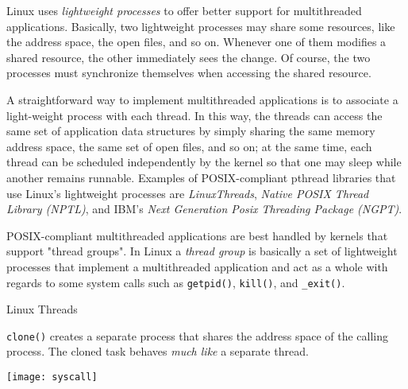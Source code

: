 Linux uses \emph{lightweight processes} to offer better support for multithreaded
applications. Basically, two lightweight processes may share some resources, like the
address space, the open files, and so on. Whenever one of them modifies a shared resource,
the other immediately sees the change. Of course, the two processes must synchronize
themselves when accessing the shared resource.

A straightforward way to implement multithreaded applications is to associate a
light-weight process with each thread. In this way, the threads can access the same set of
application data structures by simply sharing the same memory address space, the same set
of open files, and so on; at the same time, each thread can be scheduled independently by
the kernel so that one may sleep while another remains runnable. Examples of
POSIX-compliant pthread libraries that use Linux's lightweight processes are
\emph{LinuxThreads}, \emph{Native POSIX Thread Library (NPTL)}, and IBM's \emph{Next
  Generation Posix Threading Package (NGPT)}.

POSIX-compliant multithreaded applications are best handled by kernels that support
"thread groups". In Linux a \emph{thread group} is basically a set of lightweight
processes that implement a multithreaded application and act as a whole with regards to
some system calls such as \texttt{getpid()}, \texttt{kill()}, and \texttt{\_exit()}.


\begin{frame}{Linux Threads}
  \begin{minipage}{.45\linewidth}
  \begin{block}{\texttt{clone()}}
    creates a separate process that shares the address space of the
    calling process. The cloned task behaves \emph{much like} a separate thread.
  \end{block}
  \end{minipage}
  \begin{minipage}{.5\linewidth}
    \texttt{[image: syscall]}
  \end{minipage}
\end{frame}

